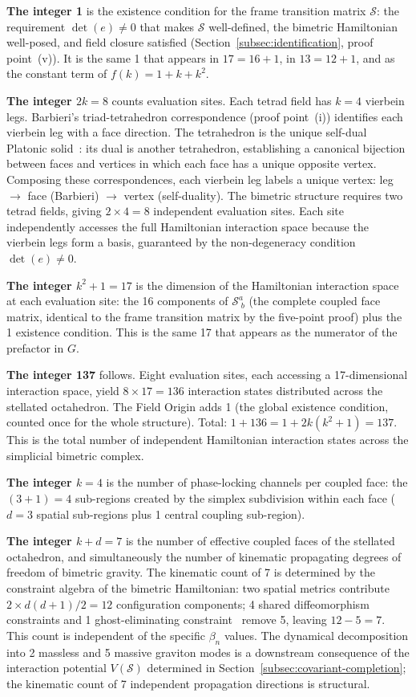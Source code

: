 \documentclass[aps,prd,preprint,superscriptaddress,showpacs,preprintnumbers,amsmath,amssymb,nofootinbib]{revtex4-2}
\begin{document}
\textbf{The integer 1} is the existence condition for the frame transition matrix $\mathcal{S}$: the requirement $\det(e) \neq 0$ that makes $\mathcal{S}$ well-defined, the bimetric Hamiltonian well-posed, and field closure satisfied (Section~\ref{subsec:identification}, proof point~(v)). It is the same 1 that appears in $17 = 16 + 1$, in $13 = 12 + 1$, and as the constant term of $f(k) = 1 + k + k^2$.

\textbf{The integer $2k = 8$} counts evaluation sites. Each tetrad field has $k = 4$ vierbein legs. Barbieri's triad-tetrahedron correspondence (proof point~(i)) identifies each vierbein leg with a face direction. The tetrahedron is the unique self-dual Platonic solid~\cite{coxeter1973}: its dual is another tetrahedron, establishing a canonical bijection between faces and vertices in which each face has a unique opposite vertex. Composing these correspondences, each vierbein leg labels a unique vertex: leg $\to$ face (Barbieri) $\to$ vertex (self-duality). The bimetric structure requires two tetrad fields, giving $2 \times 4 = 8$ independent evaluation sites. Each site independently accesses the full Hamiltonian interaction space because the vierbein legs form a basis, guaranteed by the non-degeneracy condition $\det(e) \neq 0$.

\textbf{The integer $k^2 + 1 = 17$} is the dimension of the Hamiltonian interaction space at each evaluation site: the 16 components of $\mathcal{S}^a_{\;b}$ (the complete coupled face matrix, identical to the frame transition matrix by the five-point proof) plus the 1 existence condition. This is the same 17 that appears as the numerator of the prefactor in $G$.

\textbf{The integer 137} follows. Eight evaluation sites, each accessing a 17-dimensional interaction space, yield $8 \times 17 = 136$ interaction states distributed across the stellated octahedron. The Field Origin adds 1 (the global existence condition, counted once for the whole structure). Total: $1 + 136 = 1 + 2k(k^2 + 1) = 137$. This is the total number of independent Hamiltonian interaction states across the simplicial bimetric complex.

\textbf{The integer $k = 4$} is the number of phase-locking channels per coupled face: the $(3{+}1) = 4$ sub-regions created by the simplex subdivision within each face ($d = 3$ spatial sub-regions plus 1 central coupling sub-region).

\textbf{The integer $k + d = 7$} is the number of effective coupled faces of the stellated octahedron, and simultaneously the number of kinematic propagating degrees of freedom of bimetric gravity. The kinematic count of 7 is determined by the constraint algebra of the bimetric Hamiltonian: two spatial metrics contribute $2 \times d(d{+}1)/2 = 12$ configuration components; 4 shared diffeomorphism constraints and 1 ghost-eliminating constraint~\cite{hassan2012} remove 5, leaving $12 - 5 = 7$. This count is independent of the specific $\beta_n$ values. The dynamical decomposition into 2 massless and 5 massive graviton modes is a downstream consequence of the interaction potential $V(\mathcal{S})$ determined in Section~\ref{subsec:covariant-completion}; the kinematic count of 7 independent propagation directions is structural.
\end{document}
